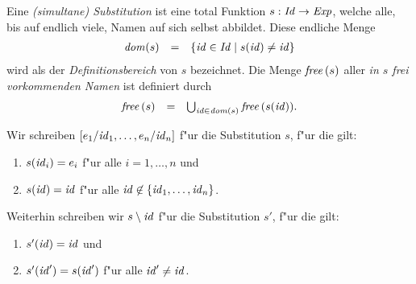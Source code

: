 \documentclass[12pt,fleqn,a4paper]{article}
\begin{document}
\begin{definition}
  Eine \emph{(simultane) Substitution} ist eine total Funktion $s: {\text{\it Id\/}} \to {\text{\it Exp\/}}$, welche alle, bis auf endlich
  viele, Namen auf sich selbst abbildet. Diese endliche Menge
  \[\begin{array}{rcl}
    {\text{\it dom\/}}(s) &=& \{{\text{\it id\/}}\in{\text{\it Id\/}} \mid s({\text{\it id\/}}) \ne {\text{\it id\/}}\}
  \end{array}\]
  wird als der \emph{Definitionsbereich} von $s$ bezeichnet. Die Menge ${\text{\it free\/}}\,(s)$ aller
  \emph{in $s$ frei vorkommenden Namen} ist definiert durch
  \[\begin{array}{rcl}
    {\text{\it free\/}}\,(s) &=& \bigcup_{{\text{\it id\/}}\in{\text{\it dom\/}}(s)}{\text{\it free\/}}\,(s({\text{\it id\/}})).
  \end{array}\]
\end{definition}

\noindent
Wir schreiben $[e_1/{\text{\it id\/}}_1,\ldots,e_n/{\text{\it id\/}}_n]$ f"ur die Substitution $s$, f"ur die gilt:
\begin{enumerate}
\item $s({\text{\it id\/}}_i) = e_i$ f"ur alle $i = 1,\ldots,n$ und
\item $s({\text{\it id\/}}) = {\text{\it id\/}}$ f"ur alle ${\text{\it id\/}} \not \in \{{\text{\it id\/}}_1,\ldots,{\text{\it id\/}}_n\}$.
\end{enumerate}
Weiterhin schreiben wir $s \setminus {\text{\it id\/}}$ f"ur die Substitution $s'$, f"ur die gilt:
\begin{enumerate}
\item $s'({\text{\it id\/}}) = {\text{\it id\/}}$ und
\item $s'({\text{\it id\/}}') = s({\text{\it id\/}}')$ f"ur alle ${\text{\it id\/}}' \ne {\text{\it id\/}}$.
\end{enumerate}
\end{document}
